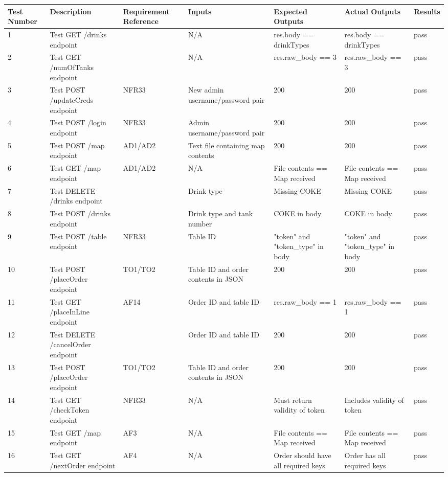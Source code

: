 \documentclass [10pt]{article}
\begin{document}
\begin{longtable}{| p{} | p{} | p{} | p{} | p{} | p{} | p{} |}\hline 
	\rowcolor{tableCell}\textbf{Test Number} & \textbf{Description} & \textbf{Requirement Reference} & \textbf{Inputs} & \textbf{Expected Outputs} & \textbf{Actual Outputs}& \textbf{Results} \\ \hline

1 &  Test GET /drinks endpoint &   &  N/A &  res.body == drinkTypes &  res.body == drinkTypes &  pass
\\ \hline  
2 &  Test GET /numOfTanks endpoint &   &  N/A &  res.raw\_body == 3 &  res.raw\_body == 3 &  pass
\\ \hline  
3 &  Test POST /updateCreds endpoint &  NFR33 &  New admin username/password pair &  200 &  200 &  pass
\\ \hline  
4 &  Test POST /login endpoint &  NFR33 &  Admin username/password pair &  200 &  200 &  pass
\\ \hline  
5 &  Test POST /map endpoint &  AD1/AD2 &  Text file containing map contents &  200 &  200 &  pass
\\ \hline  
6 &  Test GET /map endpoint &  AD1/AD2 &  N/A &  File contents == Map received &  File contents == Map received &  pass
\\ \hline  
7 &  Test DELETE /drinks endpoint &   &  Drink type &  Missing COKE &  Missing COKE &  pass
\\ \hline  
8 &  Test POST /drinks endpoint &   &  Drink type and tank number &  COKE in body &  COKE in body &  pass
\\ \hline  
9 &  Test POST /table endpoint &  NFR33 &  Table ID &  "token" and "token\_type" in body &  "token" and "token\_type" in body &  pass
\\ \hline  
10 &  Test POST /placeOrder endpoint &  TO1/TO2 &  Table ID and order contents in JSON &  200 &  200 &  pass
\\ \hline  
11 &  Test GET /placeInLine endpoint &  AF14 &  Order ID and table ID &  res.raw\_body == 1 &  res.raw\_body == 1 &  pass
\\ \hline  
12 &  Test DELETE /cancelOrder endpoint &   &  Order ID and table ID &  200 &  200 &  pass
\\ \hline  
13 &  Test POST /placeOrder endpoint &  TO1/TO2 &  Table ID and order contents in JSON &  200 &  200 &  pass
\\ \hline  
14 &  Test GET /checkToken endpoint &  NFR33 &  N/A &  Must return validity of token &  Includes validity of token &  pass
\\ \hline  
15 &  Test GET /map endpoint &  AF3 &  N/A &  File contents == Map received &  File contents == Map received &  pass
\\ \hline  
16 &  Test GET /nextOrder endpoint &  AF4 &  N/A &  Order should have all required keys &  Order has all required keys &  pass \\ \hline  
\end{longtable}
\end{document}
